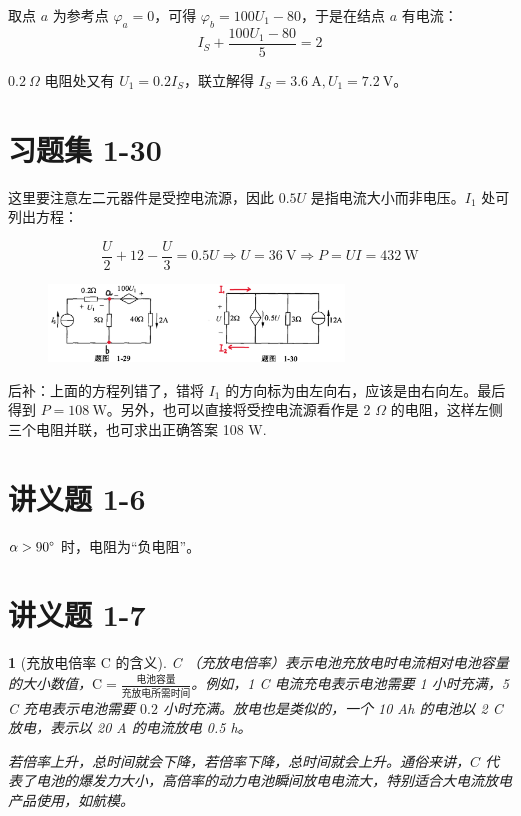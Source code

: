 \documentclass[UTF8]{report}
\theoremstyle{MyLineTheoremStyle} %
\theoremstyle{MyBlockTheoremStyle} %
\theoremstyle{MySubsubsectionStyle} %
\newtheorem{definition}{}
\begin{document}
取点 $a$ 为参考点 $\varphi_a = 0$，可得 $\varphi_b = 100U_1 - 80$，于是在结点 $a$ 有电流：
\begin{equation*}
I_S + \frac{100U_1 - 80}{5} = 2
\end{equation*}

$0.2\ \Omega$ 电阻处又有 $U_1 = 0.2 I_S$，联立解得 $I_S = 3.6 \ \mathrm{A}, U_1 = 7.2 \ \mathrm{V}$。

\section{习题集 1-30}

这里要注意左二元器件是受控电流源，因此 $0.5U$ 是指电流大小而非电压。$I_1$ 处可列出方程：

\begin{equation*}
\frac{U}{2} + 12 - \frac{U}{3} = 0.5U \Longrightarrow U = 36 \ \mathrm{V} \Longrightarrow P = UI = 432 \ \mathrm{W}
\end{equation*}

\begin{figure}[H]\centering
\includegraphics[width=0.7\textwidth]{assets/1/94b342032a5f6622a60b3c9d99e37993.png}
\end{figure}

{\par\color{gray}\small
后补：上面的方程列错了，错将 $I_1$ 的方向标为由左向右，应该是由右向左。最后得到 $P = 108\ \mathrm{W}$。另外，也可以直接将受控电流源看作是 2 $\Omega$ 的电阻，这样左侧三个电阻并联，也可求出正确答案 108 W.
\par}


\section{讲义题 1-6}

$\alpha > 90 \text{\textdegree}$ 时，电阻为“负电阻”。

\section{讲义题 1-7}


\begin{definition}[充放电倍率 C 的含义]
C （充放电倍率）表示电池充放电时电流相对电池容量的大小数值，$\mathrm{C} = \frac{\text{电池容量}}{\text{充放电所需时间}}$。例如，1 C 电流充电表示电池需要 1 小时充满，5 C 充电表示电池需要 $0.2$ 小时充满。放电也是类似的，一个 10 Ah 的电池以 2 C 放电，表示以 20 A 的电流放电 0.5 h。 \par
若倍率上升，总时间就会下降，若倍率下降，总时间就会上升。通俗来讲，$C$ 代表了电池的爆发力大小，高倍率的动力电池瞬间放电电流大，特别适合大电流放电产品使用，如航模。
\end{definition}
\end{document}
